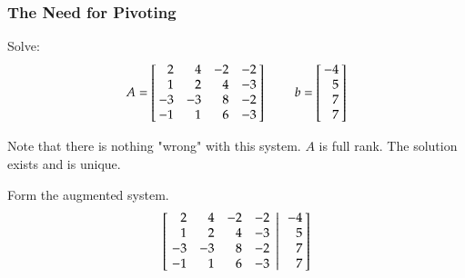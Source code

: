 \documentclass[10pt]{beamer}
\begin{document}
\begin{frame}
\frametitle{The Need for Pivoting}

Solve:
\begin{equation*}
    A = \left[\negthickspace\begin{array}{rrrr}  2 &  4 & -2 & -2 \\
                                                 1 &  2 &  4 & -3 \\
                                                -3 & -3 &  8 & -2 \\
                                                -1 &  1 &  6 & -3 \end{array}\negthickspace\right]
    \ \ \ \ \ \ \ \ \
    b = \left[\negthickspace\begin{array}{r} -4 \\  5 \\ 7 \\ 7 \end{array}\negthickspace\right]
\end{equation*}

Note that there is nothing "wrong" with this system.  $A$ is full
rank.  The solution exists and is unique.

Form the augmented system.
\begin{equation*}
    \left[
           \left.\negthickspace\begin{array}{rrrr}  2 &  4 & -2 & -2 \\
                                                    1 &  2 &  4 & -3 \\
                                                   -3 & -3 &  8 & -2 \\
                                                   -1 &  1 &  6 & -3 \end{array}
           \right|\begin{array}{r} -4 \\  5 \\ 7 \\ 7 \end{array}\negthickspace\right]
\end{equation*}

\end{frame}
\end{document}
